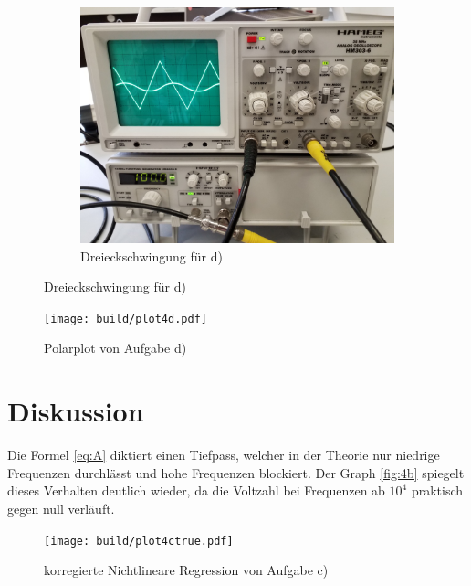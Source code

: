 \begin{figure}[H]
\begin{subfigure}{0.48\linewidth}
      \includegraphics[width=\textwidth]{images/dreieck.jpg}
      \centering
      \caption{Dreieckschwingung für d)}  
    \end{subfigure}
  \end{figure}



  \begin{figure}[H]
    \texttt{[image: build/plot4d.pdf]}
    \centering
    \caption{Polarplot von Aufgabe d)}
    \label{fig:4d}
  \end{figure}

  


\section{Diskussion}

Die Formel \ref{eq:A} diktiert einen Tiefpass, welcher in der Theorie nur niedrige Frequenzen durchlässt und hohe Frequenzen
blockiert. Der Graph \ref{fig:4b} spiegelt dieses Verhalten deutlich wieder, da die Voltzahl bei Frequenzen ab $10^4$ 
praktisch gegen null verläuft. 





  \begin{figure}[H]
    \texttt{[image: build/plot4ctrue.pdf]}
    \centering
    \caption{korregierte Nichtlineare Regression von Aufgabe c)}
    \label{fig:4ctrue}
  \end{figure}

\newpage
\nocite{V353}
\nocite{scipy}
\nocite{uncertainties}
\printbibliography
